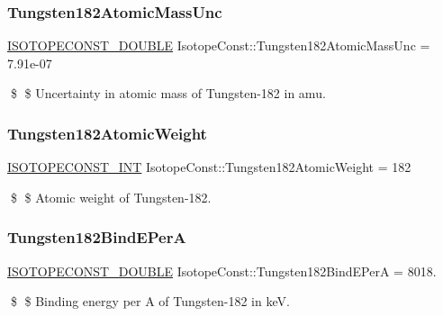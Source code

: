 \subsubsection{\texorpdfstring{Tungsten182\+Atomic\+Mass\+Unc}{Tungsten182AtomicMassUnc}}
{\footnotesize\ttfamily \mbox{\hyperlink{group___isotope_const-_macros_ga8f45a7272ce02c0b4c65c44636ed719a}{I\+S\+O\+T\+O\+P\+E\+C\+O\+N\+S\+T\+\_\+\+D\+O\+U\+B\+LE}} Isotope\+Const\+::\+Tungsten182\+Atomic\+Mass\+Unc = 7.\+91e-\/07}

\$ \$ Uncertainty in atomic mass of Tungsten-\/182 in amu. \mbox{\label{group___isotope_const-_tungsten-_w182_ga016c181925533ed6ed1ad327141bb5f8}} 
\subsubsection{\texorpdfstring{Tungsten182\+Atomic\+Weight}{Tungsten182AtomicWeight}}
{\footnotesize\ttfamily \mbox{\hyperlink{group___isotope_const-_macros_ga5f18360b3e99483a35c32d789e62621c}{I\+S\+O\+T\+O\+P\+E\+C\+O\+N\+S\+T\+\_\+\+I\+NT}} Isotope\+Const\+::\+Tungsten182\+Atomic\+Weight = 182}

\$ \$ Atomic weight of Tungsten-\/182. \mbox{\label{group___isotope_const-_tungsten-_w182_ga914cd70841bb0cbdd6b5fb3cea4de7de}} 
\subsubsection{\texorpdfstring{Tungsten182\+Bind\+E\+PerA}{Tungsten182BindEPerA}}
{\footnotesize\ttfamily \mbox{\hyperlink{group___isotope_const-_macros_ga8f45a7272ce02c0b4c65c44636ed719a}{I\+S\+O\+T\+O\+P\+E\+C\+O\+N\+S\+T\+\_\+\+D\+O\+U\+B\+LE}} Isotope\+Const\+::\+Tungsten182\+Bind\+E\+PerA = 8018.}

\$ \$ Binding energy per A of Tungsten-\/182 in keV. \mbox{\label{group___isotope_const-_tungsten-_w182_ga6871676eaf3bf410c358ef86bdbac396}} 
